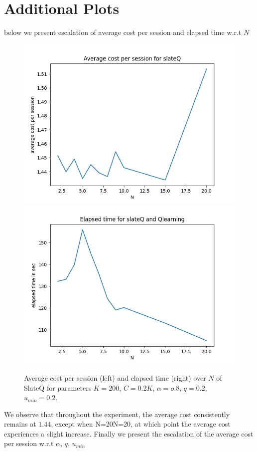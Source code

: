 \documentclass[12pt]{article}
\begin{document}
\section*{{\bf Additional Plots}}
below we present  escalation of average cost per session and elapsed time w.r.t $N$
\begin{figure}[H] %
    \centering
    \includegraphics[width=0.49\linewidth]{Figure_5.png}
    \includegraphics[width=0.49\linewidth]{Figure_6.png}
    \caption{Average cost per session (left) and elapsed time (right) over $N$ of SlateQ for parameters $K=200$, $C=0.2K$, $\alpha = o.8$, $q= 0.2$, $u_{min} = 0.2$.}
\end{figure}
We observe that throughout the experiment, the average cost consistently remains at $1.44$, except when N=20N=20, at which point the average cost experiences a slight increase.
Finally we present the escalation of the average cost per session w.r.t $\alpha$, $q$, $u_{min}$
\end{document}
